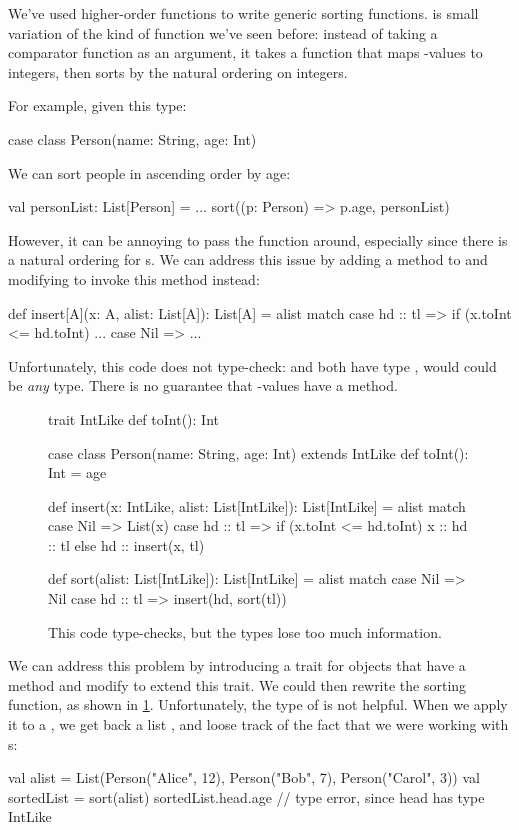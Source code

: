 \documentclass[9pt]{extbook}
\begin{document}
We've used higher-order functions to write generic sorting functions.
 is small variation of the kind of function we've
seen before: instead of taking a comparator function as an argument, it takes a
 function that maps
-values to integers, then sorts by the natural ordering
on integers.

For example, given this type:
\begin{scalacode}
case class Person(name: String, age: Int)
\end{scalacode}
We can sort people in ascending order by age:
\begin{scalacode}
val personList: List[Person] = ...
sort((p: Person) => p.age, personList)
\end{scalacode}

However, it can be annoying to pass the  function around,
especially since there is a natural ordering for s.
We can address this issue by adding a  method
to  and modifying  to invoke this
method instead:
\begin{scalacode}
def insert[A](x: A, alist: List[A]): List[A] = alist match {
  case hd :: tl => if (x.toInt <= hd.toInt) ...
  case Nil => ...
}
\end{scalacode}
Unfortunately, this code does not type-check:  and  both have type ,
would could be \emph{any} type. There is no guarantee that -values have a 
method.

\begin{figure}
\begin{scalacode}
trait IntLike {
  def toInt(): Int
}

case class Person(name: String, age: Int) extends IntLike {
  def toInt(): Int = age
}

def insert(x: IntLike, alist: List[IntLike]): List[IntLike] = alist match {
  case Nil => List(x)
  case hd :: tl => if (x.toInt <= hd.toInt) { x :: hd :: tl } else { hd :: insert(x, tl) }
}

def sort(alist: List[IntLike]): List[IntLike] = alist match {
  case Nil => Nil
  case hd :: tl => insert(hd, sort(tl))
}
\end{scalacode}
\caption{This code type-checks, but the types lose too much information.}
\label{sorting_fail}
\end{figure}

We can address this problem by introducing a trait for objects that have a
 method and modify  to extend this trait.
We could then rewrite the sorting function, as shown in \cref{sorting_fail}.
Unfortunately, the type of  is not helpful. When we apply
it to a , we get back a list ,
and loose track of the fact that we were working with s:
\begin{scalacode}
val alist = List(Person("Alice", 12), Person("Bob", 7), Person("Carol", 3))
val sortedList = sort(alist)
sortedList.head.age // type error, since head has type IntLike
\end{scalacode}
\end{document}
